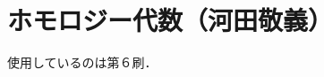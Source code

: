 \documentclass[a4paper, leqno]{ltjsreport}
\begin{document}
\chapter*{ホモロジー代数（河田敬義）}
使用しているのは第６刷．

\tableofcontents





\end{document}
